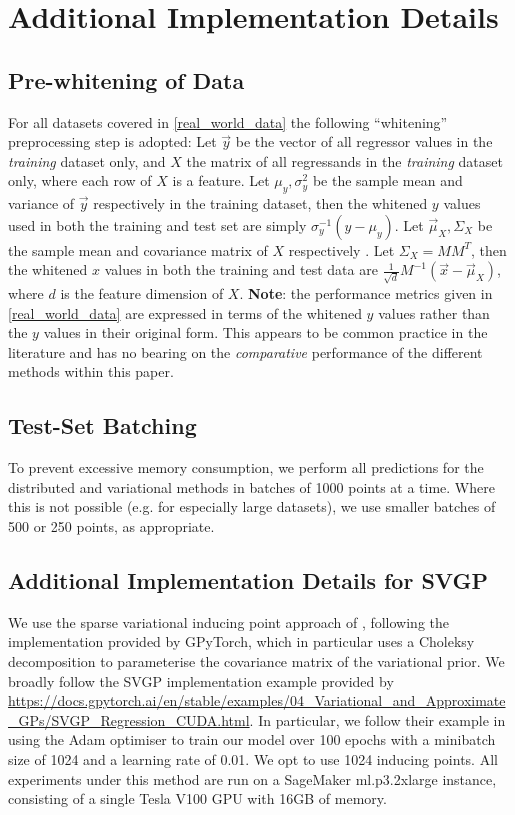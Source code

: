 \section{Additional Implementation Details}\label{appx:distrib_var}
\label{appx:more_implementational_details}
\subsection{Pre-whitening of Data}
\label{appx:prewhiten}
For all datasets covered in \autoref{real_world_data} the following ``whitening'' preprocessing step is adopted:
Let $\vec{y}$ be the vector of all regressor values in the {\it training} dataset only, and $X$ the matrix of all regressands in the {\it training} dataset only, where each row of $X$ is a feature.
Let $\mu_y, \sigma_y^2$ be the sample mean and variance of $\vec{y}$ respectively in the training dataset, then the whitened $y$ values used in both the training and test set are simply $\sigma_y^{-1}(y - \mu_y)$.
Let $\vec{\mu}_X, \Sigma_X$ be the sample mean and covariance matrix of $X$ respectively .
Let $\Sigma_X = M M^T$, then the whitened $x$ values in both the training and test data are $\frac{1}{\sqrt{d}}M^{-1}(\vec{x} - \vec{\mu}_X)$, where $d$ is the feature dimension of $X$. \textbf{Note}: the performance metrics given in \autoref{real_world_data} are expressed in terms of the whitened $y$ values rather than the $y$ values in their original form. This appears to be common practice in the literature and has no bearing on the {\it comparative} performance of the different methods within this paper.

\subsection{Test-Set Batching}
To prevent excessive memory consumption, we perform all predictions for the distributed and variational methods in batches of 1000 points at a time. Where this is not possible (e.g. for especially large datasets), we use smaller batches of 500 or 250 points, as appropriate.

\subsection{Additional Implementation Details for  SVGP}
We use the sparse variational inducing point approach of \cite{Hensman}, following the implementation provided by GPyTorch, which in particular uses a Choleksy decomposition to parameterise the covariance matrix of the variational prior.
We broadly follow the SVGP implementation example provided by \url{https://docs.gpytorch.ai/en/stable/examples/04_Variational_and_Approximate_GPs/SVGP_Regression_CUDA.html}. In particular, we follow their example in using the Adam optimiser to train our model over 100 epochs with a minibatch size of 1024 and a learning rate of 0.01. We opt to use 1024 inducing points. All experiments under this method are run on a SageMaker ml.p3.2xlarge instance, consisting of a single Tesla V100 GPU with 16GB of memory.


